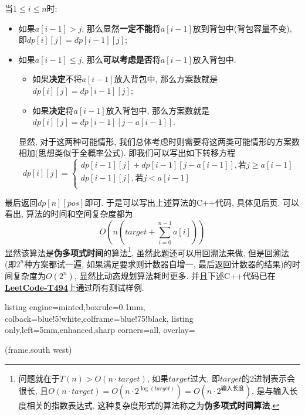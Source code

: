 \documentclass{article}
\begin{document}
\begin{homeworkProblem}
	当$1\leq i\leq n$时:
	\begin{itemize}
		\item 如果$a[i-1]>j$, 那么显然\textbf{一定不能}将$a[i-1]$放到背包中(背包容量不变), 即$dp[i][j]=dp[i-1][j]$;
		\item 如果$a[i-1]\leq j$, 那么\textbf{可以考虑是否}将$a[i-1]$放入背包中.
		\begin{itemize}
			\item 如果\textbf{决定}不将$a[i-1]$放入背包中, 那么方案数就是$dp\left[ i \right] \left[ j \right] =dp\left[ i-1 \right] \left[ j \right]$;
			\item 如果\textbf{决定}将$a[i-1]$放入背包中, 那么方案数就是$dp\left[ i \right] \left[ j \right] =dp\left[ i-1 \right] \left[ j-a\left[ i-1 \right] \right]$.
		\end{itemize}
		显然, 对于这两种可能情形, 我们总体考虑时则需要将这两类可能情形的方案数相加(思想类似于全概率公式).
		即我们可以写出如下转移方程
		$$
		dp\left[ i \right] \left[ j \right] =\begin{cases}
			dp\left[ i-1 \right] \left[ j \right] +dp\left[ i-1 \right] \left[ j-a\left[ i-1 \right] \right] , \text{若}j\ge a\left[ i-1 \right]\\
			dp\left[ i-1 \right] \left[ j \right] , \text{若}j<a\left[ i-1 \right]\\
		\end{cases}
		$$
	\end{itemize}
	最后返回$dp\left[ n \right] \left[ pos \right] $即可. 于是可以写出上述算法的C++代码, 具体见后页. 可以看出, 算法的时间和空间复杂度都为$$O\left( n\left( target+\sum_{i=0}^{n-1}{a\left[ i \right]} \right) \right)$$
	显然该算法是\textbf{伪多项式时间}的算法\footnote{问题就在于$T(n)>O\left( n\cdot target \right)$, 如果$target$过大, 即$target$的2进制表示会很长, 且$O\left( n\cdot target \right) =O\left( n\cdot 2^{\log \left( target \right)} \right) =O\left( n\cdot 2^{\text{输入长度}} \right)$, 是与输入长度相关的指数表达式, 这种复杂度形式的算法称之为\textbf{伪多项式时间算法}.}, 虽然此题还可以用回溯法来做, 但是回溯法(即$2^n$种方案都试一遍, 如果满足要求则计数器自增一, 最后返回计数器的结果)的时间复杂度为$O(2^n)$, 显然比动态规划算法耗时更多. 并且下述C++代码已在\href{https://leetcode.cn/problems/target-sum/}{\textbf{LeetCode-T494}}上通过所有测试样例.
	\newpage
\begin{tcblisting}{listing engine=minted,boxrule=0.1mm,
colback=blue!5!white,colframe=blue!75!black,
listing only,left=5mm,enhanced,sharp corners=all,
overlay={\begin{tcbclipinterior} (frame.south west)

\end{tcbclipinterior}}}
\end{tcblisting}
\end{homeworkProblem}
\end{document}
